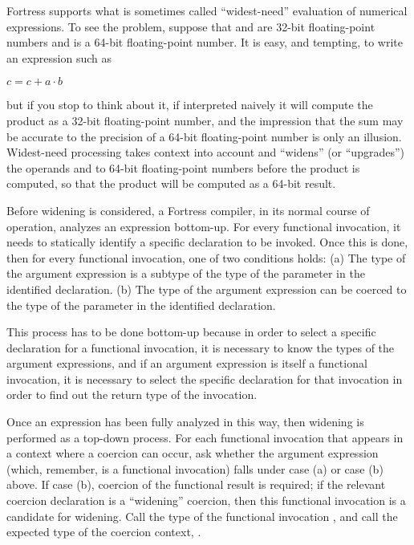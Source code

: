 Fortress supports what is sometimes called ``widest-need'' evaluation
of numerical expressions.  To see the problem, suppose that 
and  are 32-bit floating-point numbers and  is a 64-bit
floating-point number.  It is easy, and tempting, to write an
expression such as
\begin{Fortress}
\(c = c + a \cdot b\)
\end{Fortress}
but if you stop to think about it, if interpreted naively it will
compute the product  as a 32-bit floating-point number,
and the impression that the sum may be accurate to the precision of a
64-bit floating-point number is only an illusion.  Widest-need
processing takes context into account and ``widens'' (or ``upgrades'')
the operands  and  to 64-bit floating-point numbers
before the product is computed, so that the product will be computed
as a 64-bit result.

Before widening is considered, a Fortress compiler,
in its normal course of operation, analyzes
an expression bottom-up.  For every functional invocation, it needs
to statically identify a specific declaration to be invoked.
Once this is done, then for %
every functional invocation, one of two conditions holds:
(a) The type of the argument expression is a subtype of the
    type of the parameter in the identified declaration.
(b) The type of the argument expression can be coerced to the
    type of the parameter in the identified declaration.

This process has to be done bottom-up because in order to select a
specific declaration for a functional invocation, it is necessary to
know the types of the argument expressions, and if an argument
expression is itself a functional invocation, it is necessary to
select the specific declaration for that invocation in order to find
out the return type of the invocation.

Once an expression has been fully analyzed in this way, then widening
is performed as a top-down process.  For each functional invocation
that appears in a context where a coercion can occur, ask
whether the argument expression (which, remember, is a functional invocation)
falls under case (a) or case (b) above.  If case (b), coercion of the
functional result is required; if the relevant coercion declaration is
a ``widening'' coercion, then this functional invocation is a
candidate for widening.  Call the type of the functional invocation
, and call the expected type of the coercion context, .


